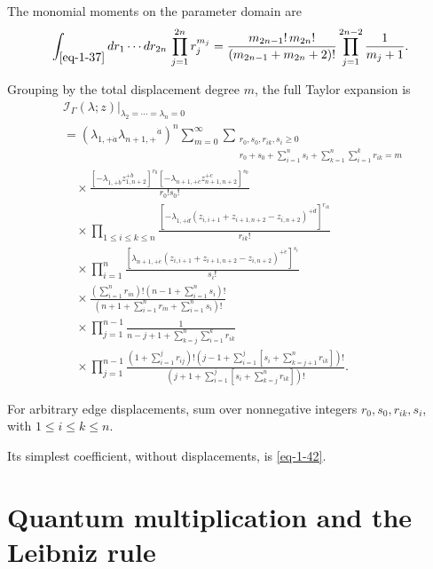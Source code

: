\documentclass[11pt]{article}
\numberwithin{equation}{section}
\numberwithin{figure}{section}
\numberwithin{table}{section}
\begin{document}
The monomial moments on the parameter domain are
\begin{equation}\label{eq-1-44}
\int_{\eqref{eq-1-37}}dr_1\cdots dr_{2n}\,\prod_{j=1}^{2n}r_j^{m_j}=\frac{m_{2n-1}!\,m_{2n}!}{(m_{2n-1}+m_{2n}+2)!}\prod_{j=1}^{2n-2}\frac1{m_j+1}.
\end{equation}

Grouping by the total displacement degree $m$, the full Taylor expansion is
\begin{equation}\label{eq-fan-full-taylor}
\begin{aligned}
&\left.\mathcal I_\Gamma(\lambda;z)
\right|_{\lambda_2=\cdots=\lambda_n=0}\\
&=(\lambda_{1,+\dot a}\lambda_{n+1,+}{}^{\dot a})^n
\sum_{m=0}^{\infty}
\sum_{\substack{r_0,s_0,r_{ik},s_i\ge0\\
r_0+s_0+\sum_{i=1}^ns_i+\sum_{k=1}^n\sum_{i=1}^kr_{ik}=m}}\\
&\quad\times
\frac{[-\lambda_{1,+\dot b}z_{1,n+2}^{+\dot b}]^{r_0}
[-\lambda_{n+1,+\dot c}z_{n+1,n+2}^{+\dot c}]^{s_0}}
{r_0!s_0!}\\
&\quad\times\prod_{1\le i\le k\le n}
\frac{\left[-\lambda_{1,+\dot d}
(z_{i,i+1}+z_{i+1,n+2}-z_{i,n+2})^{+\dot d}\right]^{r_{ik}}}
{r_{ik}!}\\
&\quad\times\prod_{i=1}^n
\frac{\left[\lambda_{n+1,+\dot e}
(z_{i,i+1}+z_{i+1,n+2}-z_{i,n+2})^{+\dot e}\right]^{s_i}}
{s_i!}\\
&\quad\times
\frac{\left(\sum_{i=1}^nr_{in}\right)!
\left(n-1+\sum_{i=1}^ns_i\right)!}
{\left(n+1+\sum_{i=1}^nr_{in}+\sum_{i=1}^ns_i\right)!}\\
&\quad\times\prod_{j=1}^{n-1}
\frac{1}{n-j+1+\sum_{k=j}^{n}\sum_{i=1}^{k}r_{ik}}\\
&\quad\times\prod_{j=1}^{n-1}
\frac{
\left(1+\sum_{i=1}^{j}r_{ij}\right)!
\left(j-1+\sum_{i=1}^{j}\left[s_i+\sum_{k=j+1}^{n}r_{ik}\right]\right)!}
{\left(j+1+\sum_{i=1}^{j}\left[s_i+\sum_{k=j}^{n}r_{ik}\right]\right)!}.
\end{aligned}
\end{equation}

For arbitrary edge displacements, sum over nonnegative integers $r_0,s_0,r_{ik},s_i$, with $1\le i\le k\le n$.

Its simplest coefficient, without displacements, is \eqref{eq-1-42}.

\section{Quantum multiplication and the Leibniz rule}\label{sec-product}
\end{document}
